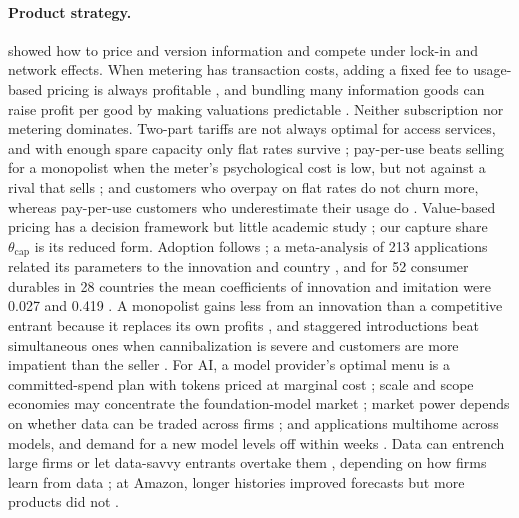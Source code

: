 \paragraph{Product strategy.} \citet{shapiro1999information} showed how to price and version information and compete under lock-in and network effects. When metering has transaction costs, adding a fixed fee to usage-based pricing is always profitable \citep{sundararajan2004nonlinear}, and bundling many information goods can raise profit per good by making valuations predictable \citep{bakos1999bundling}. Neither subscription nor metering dominates. Two-part tariffs are not always optimal for access services, and with enough spare capacity only flat rates survive \citep{essegaier2002pricing}; pay-per-use beats selling for a monopolist when the meter's psychological cost is low, but not against a rival that sells \citep{balasubramanian2015pricing}; and customers who overpay on flat rates do not churn more, whereas pay-per-use customers who underestimate their usage do \citep{lambrecht2006paying}. Value-based pricing has a decision framework but little academic study \citep{hinterhuber2004towards}; our capture share $\theta_{\mathrm{cap}}$ is its reduced form. Adoption follows \citet{bass1969new}; a meta-analysis of 213 applications related its parameters to the innovation and country \citep{sultan1990meta}, and for 52 consumer durables in 28 countries the mean coefficients of innovation and imitation were 0.027 and 0.419 \citep{vandenbulte2004social}. A monopolist gains less from an innovation than a competitive entrant because it replaces its own profits \citep{arrow1962economic}, and staggered introductions beat simultaneous ones when cannibalization is severe and customers are more impatient than the seller \citep{moorthy1992market}. For AI, a model provider's optimal menu is a committed-spend plan with tokens priced at marginal cost \citep{bergemann2025menu}; scale and scope economies may concentrate the foundation-model market \citep{korinek2025concentrating}; market power depends on whether data can be traded across firms \citep{gans2024market}; and applications multihome across models, and demand for a new model levels off within weeks \citep{fradkin2025demand}. Data can entrench large firms or let data-savvy entrants overtake them \citep{farboodi2019big,farboodi2021model}, depending on how firms learn from data \citep{hagiu2023data}; at Amazon, longer histories improved forecasts but more products did not \citep{bajari2019impact}.

